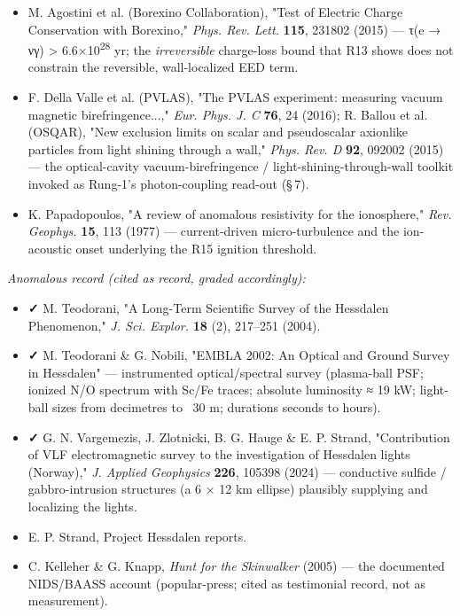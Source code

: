 \documentclass[11pt]{article}
\begin{document}
\begin{itemize}
\item M. Agostini et al. (Borexino Collaboration), "Test of Electric Charge Conservation with Borexino," \emph{Phys. Rev. Lett.} \textbf{115}, 231802 (2015) --- τ(e → νγ) > 6.6×10\textsuperscript{28} yr; the \emph{irreversible} charge-loss bound that R13 shows does not constrain the reversible, wall-localized EED term.
\item F. Della Valle et al. (PVLAS), "The PVLAS experiment: measuring vacuum magnetic birefringence...," \emph{Eur. Phys. J. C} \textbf{76}, 24 (2016); R. Ballou et al. (OSQAR), "New exclusion limits on scalar and pseudoscalar axionlike particles from light shining through a wall," \emph{Phys. Rev. D} \textbf{92}, 092002 (2015) --- the optical-cavity vacuum-birefringence / light-shining-through-wall toolkit invoked as Rung-1's photon-coupling read-out (\S\,7).
\item K. Papadopoulos, "A review of anomalous resistivity for the ionosphere," \emph{Rev. Geophys.} \textbf{15}, 113 (1977) --- current-driven micro-turbulence and the ion-acoustic onset underlying the R15 ignition threshold.
\end{itemize}

\emph{Anomalous record (cited as record, graded accordingly):}

\begin{itemize}
\item \textbf{✓} M. Teodorani, "A Long-Term Scientific Survey of the Hessdalen Phenomenon," \emph{J. Sci. Explor.} \textbf{18} (2), 217--251 (2004).
\item \textbf{✓} M. Teodorani \& G. Nobili, "EMBLA 2002: An Optical and Ground Survey in Hessdalen" --- instrumented optical/spectral survey (plasma-ball PSF; ionized N/O spectrum with Sc/Fe traces; absolute luminosity ≈ 19 kW; light-ball sizes from decimetres to ~30 m; durations seconds to hours).
\item \textbf{✓} G. N. Vargemezis, J. Zlotnicki, B. G. Hauge \& E. P. Strand, "Contribution of VLF electromagnetic survey to the investigation of Hessdalen lights (Norway)," \emph{J. Applied Geophysics} \textbf{226}, 105398 (2024) --- conductive sulfide / gabbro-intrusion structures (a 6 × 12 km ellipse) plausibly supplying and localizing the lights.
\item E. P. Strand, Project Hessdalen reports.
\item C. Kelleher \& G. Knapp, \emph{Hunt for the Skinwalker} (2005) --- the documented NIDS/BAASS account (popular-press; cited as testimonial record, not as measurement).
\end{itemize}
\end{document}
